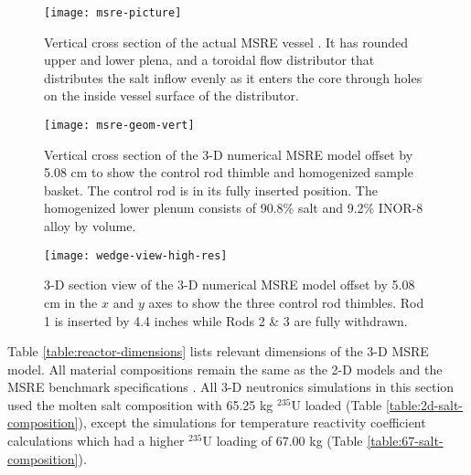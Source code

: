 \begin{figure}[p]
  \centering
  \texttt{[image: msre-picture]}
  \caption{Vertical cross section of the actual \gls{MSRE} vessel \cite{robertson_msre_1965}.
  It has rounded upper and lower
  plena, and a toroidal flow distributor that distributes the salt inflow evenly as it enters the
  core through holes on the inside vessel surface of the distributor.}
  \label{fig:msre-picture}
\end{figure}

\begin{figure}[p]
  \centering
  \texttt{[image: msre-geom-vert]}
  \caption{Vertical cross section of the 3-D numerical \gls{MSRE} model offset by 5.08 cm to show
  the control rod thimble and homogenized sample basket. The control rod is in its fully inserted
  position. The homogenized lower plenum consists of 90.8\% salt and 9.2\% INOR-8 alloy by volume.}
  \label{fig:msre-geom-vert}
\end{figure}

\begin{figure}[p]
  \centering
  \texttt{[image: wedge-view-high-res]}
  \caption{3-D section view of the 3-D numerical \gls{MSRE} model offset by 5.08 cm in the $x$ and
  $y$ axes to show the three control rod thimbles. Rod 1 is inserted by 4.4 inches while Rods 2 \&
  3 are fully withdrawn.}
  \label{fig:wedge-view}
\end{figure}

Table \ref{table:reactor-dimensions} lists relevant dimensions of the 3-D \gls{MSRE} model.
All material compositions remain
the same as the 2-D models and the \gls{MSRE} benchmark specifications \cite{fratoni_molten_2020}.
All 3-D neutronics simulations in this section used the molten salt composition with 65.25 kg
$^{235}$U loaded (Table \ref{table:2d-salt-composition}), except the simulations for temperature
reactivity coefficient calculations which had a higher $^{235}$U loading of 67.00 kg (Table
\ref{table:67-salt-composition}).


